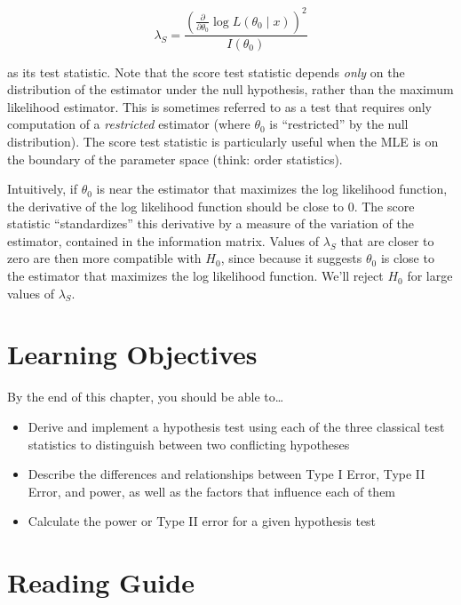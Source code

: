 \documentclass[
  letterpaper,
  DIV=11,
  numbers=noendperiod]{scrreprt}
\providecommand{\tightlist}{%
  \setlength{\itemsep}{0pt}\setlength{\parskip}{0pt}}\usepackage{longtable,booktabs,array}
\begin{document}
\[
\lambda_S = \frac{\left( \frac{\partial}{\partial \theta_0} \log L(\theta_0 \mid x) \right)^2}{I(\theta_0)}
\]

as its test statistic. Note that the score test statistic depends
\emph{only} on the distribution of the estimator under the null
hypothesis, rather than the maximum likelihood estimator. This is
sometimes referred to as a test that requires only computation of a
\emph{restricted} estimator (where \(\theta_0\) is ``restricted'' by the
null distribution). The score test statistic is particularly useful when
the MLE is on the boundary of the parameter space (think: order
statistics).

Intuitively, if \(\theta_0\) is near the estimator that maximizes the
log likelihood function, the derivative of the log likelihood function
should be close to \(0\). The score statistic ``standardizes'' this
derivative by a measure of the variation of the estimator, contained in
the information matrix. Values of \(\lambda_S\) that are closer to zero
are then more compatible with \(H_0\), since because it suggests
\(\theta_0\) is close to the estimator that maximizes the log likelihood
function. We'll reject \(H_0\) for large values of \(\lambda_S\).

\hypertarget{learning-objectives-6}{%
\section{Learning Objectives}\label{learning-objectives-6}}

By the end of this chapter, you should be able to\ldots{}

\begin{itemize}
\tightlist
\item
  Derive and implement a hypothesis test using each of the three
  classical test statistics to distinguish between two conflicting
  hypotheses
\item
  Describe the differences and relationships between Type I Error, Type
  II Error, and power, as well as the factors that influence each of
  them
\item
  Calculate the power or Type II error for a given hypothesis test
\end{itemize}

\hypertarget{reading-guide-6}{%
\section{Reading Guide}\label{reading-guide-6}}
\end{document}

